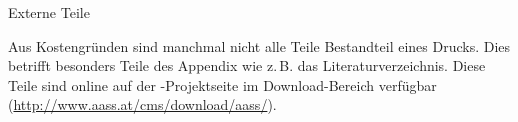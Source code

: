 \documentclass[
ngerman,
paper=a4,
asymmetric,
fontsize=9.5pt,
draft=false,
numbers=noenddot,
footnotes=multiple,
toc=flat,
]{scrbook}
\renewcommand{\Abk}[1]{#1} 			%
\begin{document}
\dominitoc[n]

{%
\setcounter{tocdepth}{3}%
%
%
\tableofcontents%
}


\Text
{Externe Teile}
{Aus Kostengründen sind manchmal nicht
alle Teile Bestandteil eines Drucks. Dies betrifft
besonders Teile des Appendix wie z.\,B. das
Literaturverzeichnis. Diese Teile
sind online auf der {\AASS}-Projektseite im
Download-Bereich verfügbar
(\url{http://www.aass.at/cms/download/aass/}).

}
{}
{}
{}
{}



\clearpage


\clearpage




 
\clearpage






\cleardoublepage

\clearpage
% 
% 
% 
% 
% 
% 
% 
% 
% 
% 
% 
% 
\end{document}
